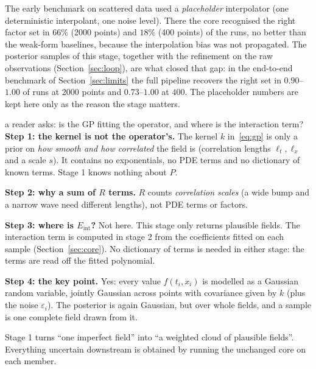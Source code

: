 \documentclass[11pt,a4paper]{article}
\theoremstyle{definition}
\newcommand{\Eint}{E_{\mathrm{int}}}
\begin{document}
\begin{caution}[title=Why this stage decides the result]
The early benchmark on scattered data used a \emph{placeholder} interpolator (one deterministic interpolant, one noise level). There the core recognised the right factor set in $66\%$ (2000 points) and $18\%$ (400 points) of the runs, no better than the weak-form baselines, because the interpolation bias was not propagated. The posterior samples of this stage, together with the refinement on the raw observations (Section~\ref{sec:loop}), are what closed that gap: in the end-to-end benchmark of Section~\ref{sec:limits} the full pipeline recovers the right set in $0.90$--$1.00$ of runs at $2000$ points and $0.73$--$1.00$ at $400$. The placeholder numbers are kept here only as the reason the stage matters.
\end{caution}

\begin{explained}{a reader asks: is the GP fitting the operator, and where is the interaction term?}
\textbf{Step 1: the kernel is not the operator's.} The kernel $k$ in~\eqref{eq:gp} is only a prior on \emph{how smooth and how correlated} the field is (correlation lengths $\ell_t,\ell_x$ and a scale $s$). It contains no exponentials, no PDE terms and no dictionary of known terms. Stage 1 knows nothing about $P$.

\medskip\textbf{Step 2: why a sum of $R$ terms.} $R$ counts \emph{correlation scales} (a wide bump and a narrow wave need different lengths), not PDE terms or factors.

\medskip\textbf{Step 3: where is $\Eint$?} Not here. This stage only returns plausible fields. The interaction term is computed in stage 2 from the coefficients fitted on each sample (Section~\ref{sec:core}). No dictionary of terms is needed in either stage: the terms are read off the fitted polynomial.

\medskip\textbf{Step 4: the key point.} Yes: every value $f(t_i,x_i)$ is modelled as a Gaussian random variable, jointly Gaussian across points with covariance given by $k$ (plus the noise $\varepsilon_i$). The posterior is again Gaussian, but over whole fields, and a sample is one complete field drawn from it.
\end{explained}

\begin{takeaway}
Stage 1 turns ``one imperfect field'' into ``a weighted cloud of plausible fields''. Everything uncertain downstream is obtained by running the unchanged core on each member.
\end{takeaway}
\end{document}
